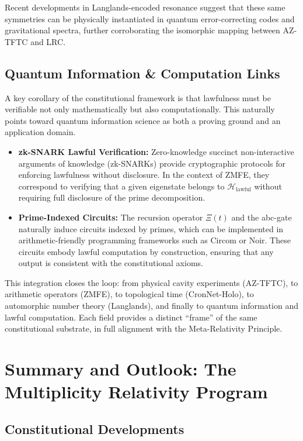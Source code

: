 \documentclass[12]{amsart}
\theoremstyle{plain}
\begin{document}
Recent developments in Langlands-encoded resonance \cite{LanglandsResonance} suggest that these same symmetries can be physically instantiated in quantum error-correcting codes and gravitational spectra, further corroborating the isomorphic mapping between AZ-TFTC and LRC.

\subsection{Quantum Information \& Computation Links}

A key corollary of the constitutional framework is that lawfulness must be verifiable not only mathematically but also computationally. 
This naturally points toward quantum information science as both a proving ground and an application domain. 

\begin{itemize}
    \item \textbf{zk-SNARK Lawful Verification:} Zero-knowledge succinct non-interactive arguments of knowledge (zk-SNARKs) provide cryptographic protocols for enforcing lawfulness without disclosure. In the context of ZMFE, they correspond to verifying that a given eigenstate belongs to $\mathcal{H}_{\mathrm{lawful}}$ without requiring full disclosure of the prime decomposition. 
    \item \textbf{Prime-Indexed Circuits:} The recursion operator $\Xi(t)$ and the abc-gate naturally induce circuits indexed by primes, which can be implemented in arithmetic-friendly programming frameworks such as Circom or Noir. These circuits embody lawful computation by construction, ensuring that any output is consistent with the constitutional axioms. 
\end{itemize}

This integration closes the loop: from physical cavity experiments (AZ-TFTC), to arithmetic operators (ZMFE), to topological time (CronNet-Holo), to automorphic number theory (Langlands), and finally to quantum information and lawful computation. 
Each field provides a distinct ``frame'' of the same constitutional substrate, in full alignment with the Meta-Relativity Principle. 

\section{Summary and Outlook: The Multiplicity Relativity Program}

\subsection{Constitutional Developments}
\end{document}
